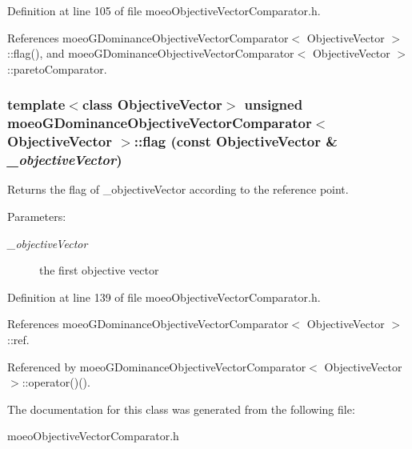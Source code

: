 Definition at line 105 of file moeo\-Objective\-Vector\-Comparator.h.

References moeo\-GDominance\-Objective\-Vector\-Comparator$<$ Objective\-Vector $>$::flag(), and moeo\-GDominance\-Objective\-Vector\-Comparator$<$ Objective\-Vector $>$::pareto\-Comparator.
\subsubsection{\setlength{\rightskip}{0pt plus 5cm}template$<$class Objective\-Vector$>$ unsigned {\bf moeo\-GDominance\-Objective\-Vector\-Comparator}$<$ Objective\-Vector $>$::flag (const Objective\-Vector \& {\em \_\-objective\-Vector})\hspace{0.3cm}{\tt  [inline, private]}}\label{classmoeoGDominanceObjectiveVectorComparator_7095866316c7f03940d22ca4b4175b7b}


Returns the flag of \_\-objective\-Vector according to the reference point. 

\begin{Desc}
\item[Parameters:]
\begin{description}
\item[{\em \_\-objective\-Vector}]the first objective vector \end{description}
\end{Desc}


Definition at line 139 of file moeo\-Objective\-Vector\-Comparator.h.

References moeo\-GDominance\-Objective\-Vector\-Comparator$<$ Objective\-Vector $>$::ref.

Referenced by moeo\-GDominance\-Objective\-Vector\-Comparator$<$ Objective\-Vector $>$::operator()().

The documentation for this class was generated from the following file:\begin{CompactItemize}
\item 
moeo\-Objective\-Vector\-Comparator.h\end{CompactItemize}
